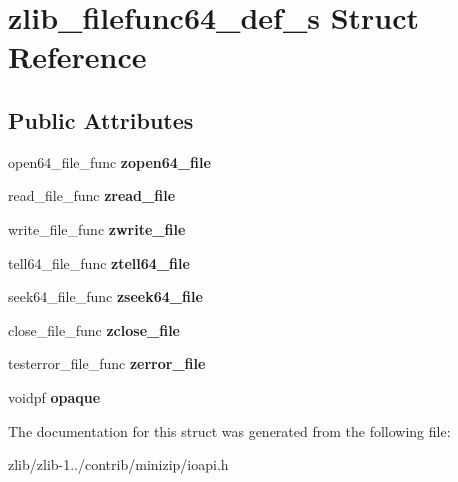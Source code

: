 \hypertarget{structzlib__filefunc64__def__s}{\section{zlib\+\_\+filefunc64\+\_\+def\+\_\+s Struct Reference}
\label{structzlib__filefunc64__def__s}
}
\subsection*{Public Attributes}
\begin{DoxyCompactItemize}
\item 
\hypertarget{structzlib__filefunc64__def__s_a53df1c67f9b44a61e607b9cfb9c409c0}{open64\+\_\+file\+\_\+func {\bfseries zopen64\+\_\+file}}\label{structzlib__filefunc64__def__s_a53df1c67f9b44a61e607b9cfb9c409c0}

\item 
\hypertarget{structzlib__filefunc64__def__s_a5fd1cd36c741000649328d0db54523c5}{read\+\_\+file\+\_\+func {\bfseries zread\+\_\+file}}\label{structzlib__filefunc64__def__s_a5fd1cd36c741000649328d0db54523c5}

\item 
\hypertarget{structzlib__filefunc64__def__s_a04f5366c9e7e48343357bb88b46998f9}{write\+\_\+file\+\_\+func {\bfseries zwrite\+\_\+file}}\label{structzlib__filefunc64__def__s_a04f5366c9e7e48343357bb88b46998f9}

\item 
\hypertarget{structzlib__filefunc64__def__s_a88b8bd0d697c49e384915fcab765b5b3}{tell64\+\_\+file\+\_\+func {\bfseries ztell64\+\_\+file}}\label{structzlib__filefunc64__def__s_a88b8bd0d697c49e384915fcab765b5b3}

\item 
\hypertarget{structzlib__filefunc64__def__s_ab03b3242d363b748ea6e60b7b9e5e6d1}{seek64\+\_\+file\+\_\+func {\bfseries zseek64\+\_\+file}}\label{structzlib__filefunc64__def__s_ab03b3242d363b748ea6e60b7b9e5e6d1}

\item 
\hypertarget{structzlib__filefunc64__def__s_aaf7d9825e2afc16c93cec9956c4f1a10}{close\+\_\+file\+\_\+func {\bfseries zclose\+\_\+file}}\label{structzlib__filefunc64__def__s_aaf7d9825e2afc16c93cec9956c4f1a10}

\item 
\hypertarget{structzlib__filefunc64__def__s_abdac5e81672673ef1f4242d6fdc49d2d}{testerror\+\_\+file\+\_\+func {\bfseries zerror\+\_\+file}}\label{structzlib__filefunc64__def__s_abdac5e81672673ef1f4242d6fdc49d2d}

\item 
\hypertarget{structzlib__filefunc64__def__s_a5f6d2267b03488a9edc3fdd9a2da0c2f}{voidpf {\bfseries opaque}}\label{structzlib__filefunc64__def__s_a5f6d2267b03488a9edc3fdd9a2da0c2f}

\end{DoxyCompactItemize}


The documentation for this struct was generated from the following file\+:\begin{DoxyCompactItemize}
\item 
zlib/zlib-\/1../contrib/minizip/ioapi.\+h\end{DoxyCompactItemize}
